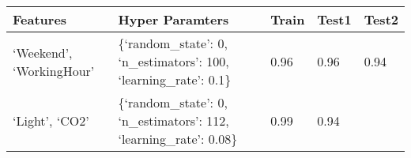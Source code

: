 \documentclass[11pt]{article}
\begin{document}
    \begin{longtable}[]{@{}lllll@{}}
\toprule
\begin{minipage}[b]{0.28\columnwidth}\raggedright
Features\strut
\end{minipage} & \begin{minipage}[b]{0.43\columnwidth}\raggedright
Hyper Paramters\strut
\end{minipage} & \begin{minipage}[b]{0.05\columnwidth}\raggedright
Train\strut
\end{minipage} & \begin{minipage}[b]{0.05\columnwidth}\raggedright
Test1\strut
\end{minipage} & \begin{minipage}[b]{0.05\columnwidth}\raggedright
Test2\strut
\end{minipage}\tabularnewline
\midrule
\endhead
\begin{minipage}[t]{0.28\columnwidth}\raggedright
`Weekend', `WorkingHour'\strut
\end{minipage} & \begin{minipage}[t]{0.43\columnwidth}\raggedright
\{`random\_state': 0, `n\_estimators': 100, `learning\_rate':
0.1\}\strut
\end{minipage} & \begin{minipage}[t]{0.05\columnwidth}\raggedright
0.96\strut
\end{minipage} & \begin{minipage}[t]{0.05\columnwidth}\raggedright
0.96\strut
\end{minipage} & \begin{minipage}[t]{0.05\columnwidth}\raggedright
0.94\strut
\end{minipage}\tabularnewline
\begin{minipage}[t]{0.28\columnwidth}\raggedright
`Light', `CO2'\strut
\end{minipage} & \begin{minipage}[t]{0.43\columnwidth}\raggedright
\{`random\_state': 0, `n\_estimators': 112, `learning\_rate':
0.08\}\strut
\end{minipage} & \begin{minipage}[t]{0.05\columnwidth}\raggedright
0.99\strut
\end{minipage} & \begin{minipage}[t]{0.05\columnwidth}\raggedright
0.94\strut
\end{minipage} & \begin{minipage}[t]{0.05\columnwidth}\raggedright

\end{minipage}
\end{longtable}
\end{document}
